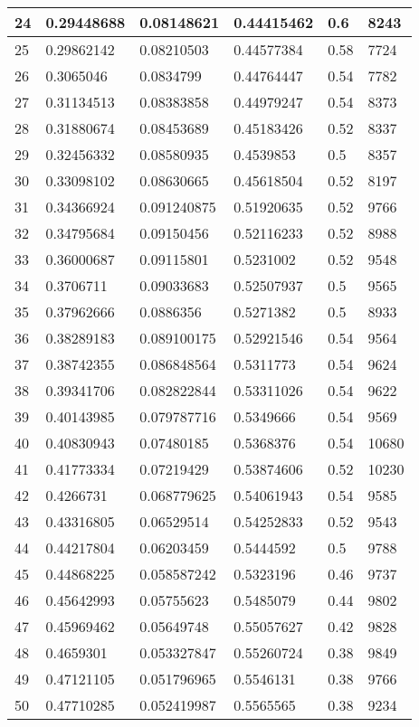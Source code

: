 \begin{longtable}{|l|l|l|l|l|l|}
24 & 0.29448688 & 0.08148621 & 0.44415462 & 0.6 & 8243 \\ \hline 
25 & 0.29862142 & 0.08210503 & 0.44577384 & 0.58 & 7724 \\ \hline 
26 & 0.3065046 & 0.0834799 & 0.44764447 & 0.54 & 7782 \\ \hline 
27 & 0.31134513 & 0.08383858 & 0.44979247 & 0.54 & 8373 \\ \hline 
28 & 0.31880674 & 0.08453689 & 0.45183426 & 0.52 & 8337 \\ \hline 
29 & 0.32456332 & 0.08580935 & 0.4539853 & 0.5 & 8357 \\ \hline 
30 & 0.33098102 & 0.08630665 & 0.45618504 & 0.52 & 8197 \\ \hline 
31 & 0.34366924 & 0.091240875 & 0.51920635 & 0.52 & 9766 \\ \hline 
32 & 0.34795684 & 0.09150456 & 0.52116233 & 0.52 & 8988 \\ \hline 
33 & 0.36000687 & 0.09115801 & 0.5231002 & 0.52 & 9548 \\ \hline 
34 & 0.3706711 & 0.09033683 & 0.52507937 & 0.5 & 9565 \\ \hline 
35 & 0.37962666 & 0.0886356 & 0.5271382 & 0.5 & 8933 \\ \hline 
36 & 0.38289183 & 0.089100175 & 0.52921546 & 0.54 & 9564 \\ \hline 
37 & 0.38742355 & 0.086848564 & 0.5311773 & 0.54 & 9624 \\ \hline 
38 & 0.39341706 & 0.082822844 & 0.53311026 & 0.54 & 9622 \\ \hline 
39 & 0.40143985 & 0.079787716 & 0.5349666 & 0.54 & 9569 \\ \hline 
40 & 0.40830943 & 0.07480185 & 0.5368376 & 0.54 & 10680 \\ \hline 
41 & 0.41773334 & 0.07219429 & 0.53874606 & 0.52 & 10230 \\ \hline 
42 & 0.4266731 & 0.068779625 & 0.54061943 & 0.54 & 9585 \\ \hline 
43 & 0.43316805 & 0.06529514 & 0.54252833 & 0.52 & 9543 \\ \hline 
44 & 0.44217804 & 0.06203459 & 0.5444592 & 0.5 & 9788 \\ \hline 
45 & 0.44868225 & 0.058587242 & 0.5323196 & 0.46 & 9737 \\ \hline 
46 & 0.45642993 & 0.05755623 & 0.5485079 & 0.44 & 9802 \\ \hline 
47 & 0.45969462 & 0.05649748 & 0.55057627 & 0.42 & 9828 \\ \hline 
48 & 0.4659301 & 0.053327847 & 0.55260724 & 0.38 & 9849 \\ \hline 
49 & 0.47121105 & 0.051796965 & 0.5546131 & 0.38 & 9766 \\ \hline 
50 & 0.47710285 & 0.052419987 & 0.5565565 & 0.38 & 9234 \\ \hline 
\end{longtable}